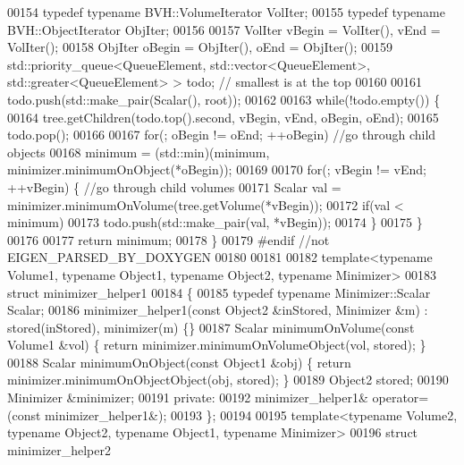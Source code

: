 \begin{DoxyCode}
00154   \textcolor{keyword}{typedef} \textcolor{keyword}{typename} BVH::VolumeIterator VolIter;
00155   \textcolor{keyword}{typedef} \textcolor{keyword}{typename} BVH::ObjectIterator ObjIter;
00156 
00157   VolIter vBegin = VolIter(), vEnd = VolIter();
00158   ObjIter oBegin = ObjIter(), oEnd = ObjIter();
00159   std::priority\_queue<QueueElement, std::vector<QueueElement>, std::greater<QueueElement> > todo; \textcolor{comment}{//
      smallest is at the top}
00160 
00161   todo.push(std::make\_pair(Scalar(), root));
00162 
00163   \textcolor{keywordflow}{while}(!todo.empty()) \{
00164     tree.getChildren(todo.top().second, vBegin, vEnd, oBegin, oEnd);
00165     todo.pop();
00166 
00167     \textcolor{keywordflow}{for}(; oBegin != oEnd; ++oBegin) \textcolor{comment}{//go through child objects}
00168       minimum = (std::min)(minimum, minimizer.minimumOnObject(*oBegin));
00169 
00170     \textcolor{keywordflow}{for}(; vBegin != vEnd; ++vBegin) \{ \textcolor{comment}{//go through child volumes}
00171       Scalar val = minimizer.minimumOnVolume(tree.getVolume(*vBegin));
00172       \textcolor{keywordflow}{if}(val < minimum)
00173         todo.push(std::make\_pair(val, *vBegin));
00174     \}
00175   \}
00176 
00177   \textcolor{keywordflow}{return} minimum;
00178 \}
00179 \textcolor{preprocessor}{#endif //not EIGEN\_PARSED\_BY\_DOXYGEN}
00180 
00181 
00182 \textcolor{keyword}{template}<\textcolor{keyword}{typename} Volume1, \textcolor{keyword}{typename} Object1, \textcolor{keyword}{typename} Object2, \textcolor{keyword}{typename} Minimizer>
00183 \textcolor{keyword}{struct }minimizer\_helper1
00184 \{
00185   \textcolor{keyword}{typedef} \textcolor{keyword}{typename} Minimizer::Scalar Scalar;
00186   minimizer\_helper1(\textcolor{keyword}{const} Object2 &inStored, Minimizer &m) : stored(inStored), minimizer(m) \{\}
00187   Scalar minimumOnVolume(\textcolor{keyword}{const} Volume1 &vol) \{ \textcolor{keywordflow}{return} minimizer.minimumOnVolumeObject(vol, stored); \}
00188   Scalar minimumOnObject(\textcolor{keyword}{const} Object1 &obj) \{ \textcolor{keywordflow}{return} minimizer.minimumOnObjectObject(obj, stored); \}
00189   Object2 stored;
00190   Minimizer &minimizer;
00191 \textcolor{keyword}{private}:
00192   minimizer\_helper1& operator=(\textcolor{keyword}{const} minimizer\_helper1&);
00193 \};
00194 
00195 \textcolor{keyword}{template}<\textcolor{keyword}{typename} Volume2, \textcolor{keyword}{typename} Object2, \textcolor{keyword}{typename} Object1, \textcolor{keyword}{typename} Minimizer>
00196 \textcolor{keyword}{struct }minimizer\_helper2

\end{DoxyCode}
